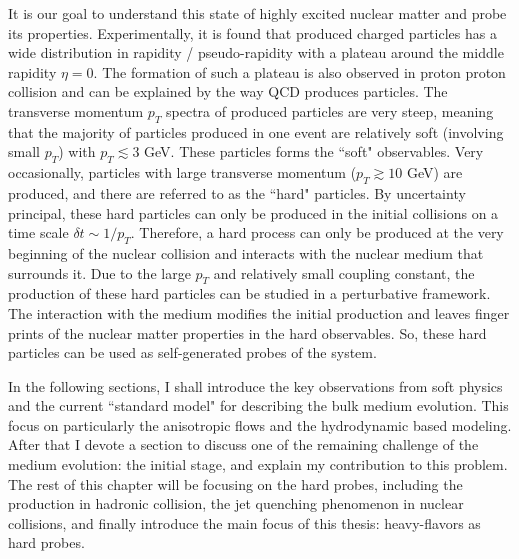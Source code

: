 It is our goal to understand this state of highly excited nuclear matter and probe its properties.
Experimentally, it is found that produced charged particles has a wide distribution in rapidity / pseudo-rapidity with a plateau around the middle rapidity $\eta = 0$.
The formation of such a plateau is also observed in proton proton collision and can be explained by the way QCD produces particles.
The transverse momentum $p_T$ spectra of produced particles are very steep, meaning that the majority of particles produced in one event are relatively soft (involving small $p_T$) with $p_T \lesssim 3$ GeV.
These particles forms the ``soft" observables. 
Very occasionally, particles with large transverse momentum ($p_T\gtrsim 10$ GeV) are produced, and there are referred to as the ``hard" particles.
By uncertainty principal, these hard particles can only be produced in the initial collisions on a time scale $\delta t \sim 1/p_T$.
Therefore, a hard process can only be produced at the very beginning of the nuclear collision and interacts with the nuclear medium that surrounds it.
Due to the large $p_T$ and relatively small coupling constant, the production of these hard particles can be studied in a perturbative framework.
The interaction with the medium modifies the initial production and leaves finger prints of the nuclear matter properties in the hard observables. 
So, these hard particles can be used as self-generated probes of the system.

In the following sections, I shall introduce the key observations from soft physics and the current ``standard model" for describing the bulk medium evolution.
This focus on particularly the anisotropic flows and the hydrodynamic based modeling.
After that I devote a section to discuss one of the remaining challenge of the medium evolution: the initial stage, and explain my contribution to this problem.
The rest of this chapter will be focusing on the hard probes, including the production in hadronic collision, the jet quenching phenomenon in nuclear collisions, and finally introduce the main focus of this thesis: heavy-flavors as hard probes.

